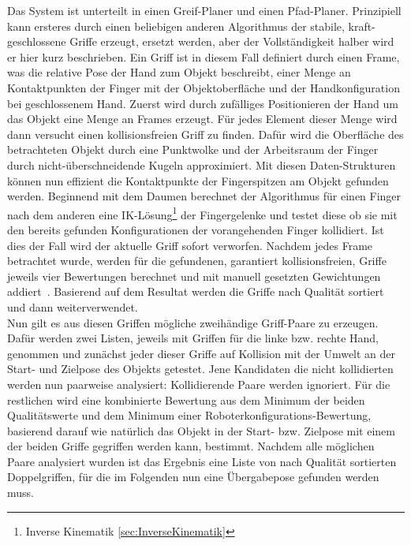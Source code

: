 Das System ist unterteilt in einen Greif-Planer und einen Pfad-Planer. Prinzipiell kann ersteres durch einen beliebigen anderen Algorithmus der stabile, kraft-geschlossene Griffe erzeugt, ersetzt werden, aber der Vollständigkeit halber wird er hier kurz beschrieben. Ein Griff ist in diesem Fall definiert durch einen \glqq Frame\grqq{}, was die relative Pose der Hand zum Objekt beschreibt, einer Menge an Kontaktpunkten der Finger mit der Objektoberfläche und der Handkonfiguration bei geschlossenem Hand. Zuerst wird durch zufälliges Positionieren der Hand um das Objekt eine Menge an \glqq Frames\grqq{} erzeugt. Für jedes Element dieser Menge wird dann versucht einen kollisionsfreien Griff zu finden. Dafür wird die Oberfläche des betrachteten Objekt durch eine Punktwolke und der Arbeitsraum der Finger durch nicht-überschneidende Kugeln approximiert. Mit diesen Daten-Strukturen können nun effizient die Kontaktpunkte der Fingerspitzen am Objekt gefunden werden. Beginnend mit dem Daumen berechnet der Algorithmus für einen Finger nach dem anderen eine IK-Lösung\footnote{\glqq Inverse Kinematik\grqq{} \ref{sec:InverseKinematik}} der Fingergelenke und testet diese ob sie mit den bereits gefunden Konfigurationen der vorangehenden Finger kollidiert. Ist dies der Fall wird der aktuelle Griff sofort verworfen. Nachdem jedes \glqq Frame\grqq{} betrachtet wurde, werden für die gefundenen, garantiert kollisionsfreien, Griffe jeweils vier Bewertungen berechnet und mit manuell gesetzten Gewichtungen addiert~\cite[Abschnitt IV-A-3]{saut2010planning}. Basierend auf dem Resultat werden die Griffe nach Qualität sortiert und dann weiterverwendet. \\
Nun gilt es aus diesen Griffen mögliche zweihändige Griff-Paare zu erzeugen. Dafür werden zwei Listen, jeweils mit Griffen für die linke bzw. rechte Hand, genommen und zunächst jeder dieser Griffe auf Kollision mit der Umwelt an der Start- und Zielpose des Objekts getestet. Jene Kandidaten die nicht kollidierten werden nun paarweise analysiert: Kollidierende Paare werden ignoriert. Für die restlichen wird eine kombinierte Bewertung aus dem Minimum der beiden Qualitätswerte und dem Minimum einer Roboterkonfigurations-Bewertung, basierend darauf wie \glqq natürlich\grqq{} das Objekt in der Start- bzw. Zielpose mit einem der beiden Griffe gegriffen werden kann, bestimmt. Nachdem alle möglichen Paare analysiert wurden ist das Ergebnis eine Liste von nach Qualität sortierten Doppelgriffen, für die im Folgenden nun eine Übergabepose gefunden werden muss.
\\

